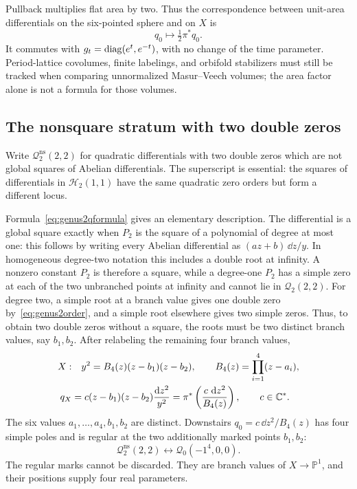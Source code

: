 Pullback multiplies flat area by two.  Thus the correspondence
between unit-area differentials on the six-pointed sphere and on
$X$ is
\[
 q_0\longmapsto\tfrac12\pi^*q_0.
\]
It commutes with $g_t=\operatorname{diag}(e^t,e^{-t})$, with no change of the time
parameter.  Period-lattice covolumes, finite labelings, and orbifold
stabilizers must still be tracked when comparing unnormalized
Masur--Veech volumes; the area factor alone is not a formula for
those volumes.

\subsection{The nonsquare stratum with two double zeros}
\label{subsec:genus2twodouble}

Write $\mathcal Q^{\mathrm{ns}}_2(2,2)$ for quadratic
differentials with two double zeros which are not global squares
of Abelian differentials.  The superscript is essential: the
squares of differentials in $\mathcal H_2(1,1)$ have the same
quadratic zero orders but form a different locus.

Formula~\eqref{eq:genus2qformula} gives an elementary description.
The differential is a global square exactly when $P_2$ is the square
of a polynomial of degree at most one: this follows by writing every
Abelian differential as $(az+b)\,\dd z/y$. In homogeneous degree-two
notation this includes a double root at infinity. A nonzero constant
$P_2$ is therefore a square, while a degree-one $P_2$ has a simple zero
at each of the two unbranched points at infinity and cannot lie in
$\mathcal Q_2(2,2)$. For degree two, a simple root at a branch value
gives one double zero by~\eqref{eq:genus2order}, and a simple root
elsewhere gives two simple zeros. Thus, to obtain two double zeros
without a square, the roots must be two distinct branch values, say
$b_1,b_2$.
After relabeling the remaining four branch values,
\begin{equation}
 \begin{split}
 X:&\quad y^2=B_4(z)(z-b_1)(z-b_2),
       \qquad B_4(z)=\prod_{i=1}^4(z-a_i),\\
 q_X&=c(z-b_1)(z-b_2)\frac{\mathop{}\!\mathrm d z^2}{y^2}
      =\pi^*\left(\frac{c\,\mathop{}\!\mathrm d z^2}{B_4(z)}\right),
      \qquad c\in\mathbb C^*.
 \end{split}
 \label{eq:genus2cancel}
\end{equation}
The six values $a_1,\ldots,a_4,b_1,b_2$ are distinct.
Downstairs $q_0=c\,\dd z^2/B_4(z)$ has four simple poles and is
regular at the two additionally marked points $b_1,b_2$:
\begin{equation}
 \mathcal Q^{\mathrm{ns}}_2(2,2)
 \longleftrightarrow \mathcal Q_0(-1^4,0,0).
 \label{eq:genus2pillowmark}
\end{equation}
The regular marks cannot be discarded.  They are branch values of
$X\to\mathbb P^1$, and their positions supply four real
parameters.

